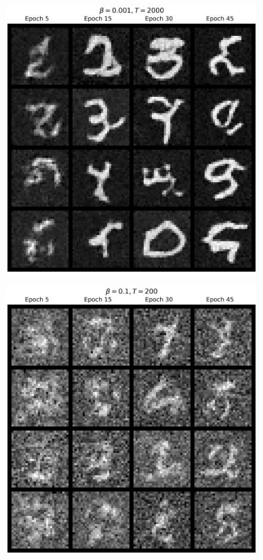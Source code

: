\documentclass[11pt]{article}
\begin{document}
\begin{figure}[H]
    \centering
    \begin{minipage}{0.48\textwidth}
        \includegraphics[width=\linewidth]{figs/q1b_good_uncond_samples.png}
        \label{fig:train_uncond_left_img}
    \end{minipage}\hfill
    \begin{minipage}{0.48\textwidth}
        \includegraphics[width=\linewidth]{figs/q1b_bad_uncond_samples.png}

\end{minipage}
\end{figure}
\end{document}
